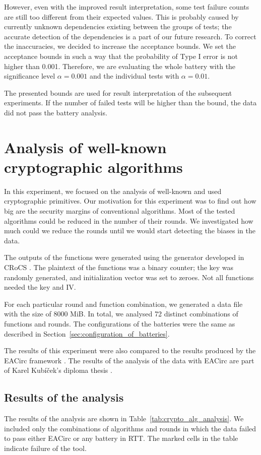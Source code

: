\documentclass[
	digital,    %
	oneside,    %
	color,
	11pt,
	nocover,
	notable,
	nolof,
	nolot,
]{fithesis3}
\theoremstyle{definition}
\theoremstyle{remark}
\begin{document}
However, even with the improved result interpretation, some test failure counts are still too different from their expected values. This is probably caused by currently unknown dependencies existing between the groups of tests; the accurate detection of the dependencies is a part of our future research. To correct the inaccuracies, we decided to increase the acceptance bounds. We set the acceptance bounds in such a way that the probability of Type I error is not higher than 0.001. Therefore, we are evaluating the whole battery with the significance level $\alpha=0.001$ and the individual tests with $\alpha=0.01$.

The presented bounds are used for result interpretation of the subsequent experiments. If the number of failed tests will be higher than the bound, the data did not pass the battery analysis.

\section{Analysis of well-known cryptographic algorithms}
\label{sec:usable_testbed}
In this experiment, we focused on the analysis of well-known and used cryptographic primitives. Our motivation for this experiment was to find out how big are the security margins of conventional algorithms. Most of the tested algorithms could be reduced in the number of their rounds. We investigated how much could we reduce the rounds until we would start detecting the biases in the data.

The outputs of the functions were generated using the generator developed in CRoCS \cite{eacirc-streams}. The plaintext of the functions was a binary counter; the key was randomly generated, and initialization vector was set to zeroes. Not all functions needed the key and IV. 

For each particular round and function combination, we generated a data file with the size of 8000 MiB. In total,  we analysed 72 distinct combinations of functions and rounds. The configurations of the batteries were the same as described in Section~\ref{sec:configuration_of_batteries}. 

The results of this experiment were also compared to the results produced by the EACirc framework \cite{eacirc-github}. The results of the analysis of the data with EACirc are part of Karel Kubíček's diploma thesis \cite{kubicek-dp}.

\subsection{Results of the analysis}
The results of the analysis are shown in Table~\ref{tab:crypto_alg_analysis}. We included only the combinations of algorithms and rounds in which the data failed to pass either EACirc or any battery in RTT. The marked cells in the table indicate failure of the tool. 
\end{document}
